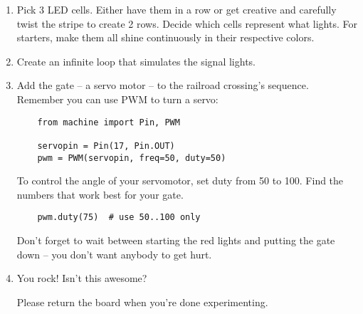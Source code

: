 \documentclass{../tutorial}
\begin{document}
\begin{enumerate}
\item
    Pick 3 LED cells.
    Either have them in a row or get creative and carefully twist the stripe
    to create 2 rows.
    Decide which cells represent what lights.
    For starters, make them all shine continuously in their respective colors.

\item
    Create an infinite loop that simulates the signal lights.

\item
    Add the gate – a servo motor – to the railroad crossing's sequence.
    Remember you can use PWM to turn a servo:

    \begin{lstlisting}
    from machine import Pin, PWM

    servopin = Pin(17, Pin.OUT)
    pwm = PWM(servopin, freq=50, duty=50)
    \end{lstlisting}

    To control the angle of your servomotor, set duty from 50 to 100.
    Find the numbers that work best for your gate.

    \begin{lstlisting}
    pwm.duty(75)  # use 50..100 only
    \end{lstlisting}

    Don't forget to wait between starting the red lights and putting the gate down –
    you don't want anybody to get hurt.

\item
    You rock! Isn't this awesome?

    Please return the board when you're done experimenting.

\end{enumerate}
\end{document}
